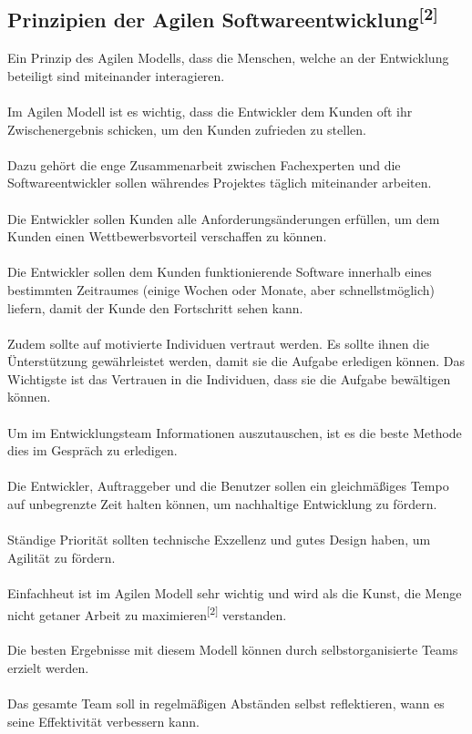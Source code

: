 \documentclass[a4paper, 10pt]{scrartcl}
\begin{document}
\subsection{Prinzipien der Agilen Softwareentwicklung\textsuperscript{[2]}}
Ein Prinzip des Agilen Modells, dass die Menschen, welche an der Entwicklung beteiligt sind miteinander interagieren.\\\\
Im Agilen Modell ist es wichtig, dass die Entwickler dem Kunden oft ihr Zwischenergebnis schicken, um den Kunden zufrieden zu stellen.\\\\
Dazu gehört die enge Zusammenarbeit zwischen Fachexperten und die Softwareentwickler sollen währendes Projektes täglich miteinander arbeiten.\\\\
Die Entwickler sollen Kunden alle Anforderungsänderungen erfüllen, um dem Kunden einen Wettbewerbsvorteil verschaffen zu können.\\\\
Die Entwickler sollen dem Kunden funktionierende Software innerhalb eines bestimmten Zeitraumes (einige Wochen oder Monate, aber schnellstmöglich) liefern, damit der Kunde den Fortschritt sehen kann.\\\\
Zudem sollte auf motivierte Individuen vertraut werden. Es sollte ihnen die Ünterstützung gewährleistet werden, damit sie die Aufgabe erledigen können. Das Wichtigste ist das Vertrauen in die Individuen, dass sie die Aufgabe bewältigen können.\\\\
Um im Entwicklungsteam Informationen auszutauschen, ist es die beste Methode dies im Gespräch zu erledigen.\\\\
Die Entwickler, Auftraggeber und die Benutzer sollen ein gleichmäßiges Tempo auf unbegrenzte Zeit halten können, um nachhaltige Entwicklung zu fördern.\\\\
Ständige Priorität sollten technische Exzellenz und gutes Design haben, um Agilität zu fördern.\\\\
Einfachheut ist im Agilen Modell sehr wichtig und wird als \glqq{}die Kunst, die Menge nicht
getaner Arbeit zu maximieren\grqq{}\textsuperscript{[2]} verstanden.\\\\
Die besten Ergebnisse mit diesem Modell können durch selbstorganisierte Teams erzielt werden.\\\\
Das gesamte Team soll in regelmäßigen Abständen selbst reflektieren, wann es seine Effektivität verbessern kann.
\end{document}
